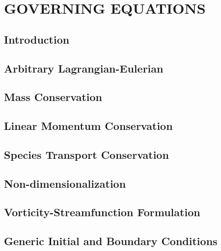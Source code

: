 \chapter{\textbf{GOVERNING EQUATIONS}}
\label{eqgov}

\section{\textbf{Introduction}} 

\label{intro equacoes de governo}

\section{\textbf{Arbitrary Lagrangian-Eulerian}} 

\label{ale}

\section{\textbf{Mass Conservation}} 
\label{conservacao massa}



\section{\textbf{Linear Momentum Conservation}} 
\label{conservacao movimento}



\section{\textbf{Species Transport Conservation}} 
\label{conservacao especie}



\section{\textbf{Non-dimensionalization}} 
\label{adimensionalizacao}



\section{\textbf{Vorticity-Streamfunction Formulation}} 
\label{corrente vorticidade}



\section{\textbf{Generic Initial and Boundary Conditions}} 
\label{condicoes contorno}



